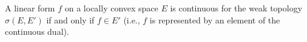 A linear form $f$ on a locally convex space $E$ is continuous for the weak topology $\sigma(E, E')$ if and only if $f \in E'$ (i.e., $f$ is represented by an element of the continuous dual).
